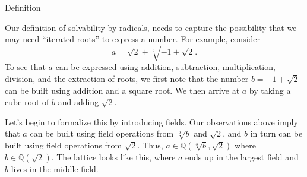 \begin{section}{Definition}

Our definition of solvability by radicals, needs to capture the possibility that we may need ``iterated roots'' to express a number. For example, consider \[a = \sqrt{2} + \sqrt[3]{-1 + \sqrt{2}}.\]
To see that $a$ can be expressed using addition, subtraction, multiplication, division, and the extraction of roots, we first note that the number $b = -1 + \sqrt{2}$ can be built using addition and a square root. We then arrive at $a$ by taking a cube root of $b$ and adding $\sqrt{2}$.

Let's begin to formalize this by introducing fields. Our observations above imply that $a$ can be built using field operations from $\sqrt[3]{b}$ and $\sqrt{2}$, and $b$ in turn can be built using field operations from $\sqrt{2}$. Thus, $a \in \mathbb{Q}\left(\sqrt[3]{b},\sqrt{2}\right)$ where $b \in \mathbb{Q}\left(\sqrt{2}\right)$. The lattice looks like this, where $a$ ends up in the largest field and $b$ lives in the middle field.
\begin{center}
\end{center}


\end{section}
